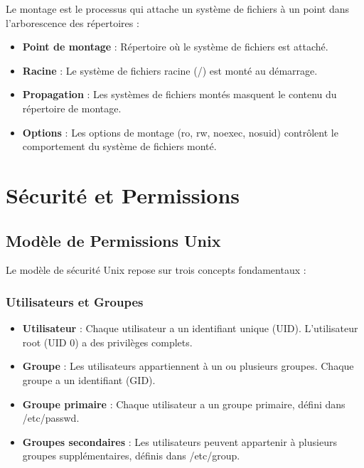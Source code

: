 \documentclass[12pt,a4paper]{article}
\begin{document}
Le montage est le processus qui attache un système de fichiers à un point dans l'arborescence des répertoires :

\begin{itemize}
    \item \textbf{Point de montage} : Répertoire où le système de fichiers est attaché.
    \item \textbf{Racine} : Le système de fichiers racine (/) est monté au démarrage.
    \item \textbf{Propagation} : Les systèmes de fichiers montés masquent le contenu du répertoire de montage.
    \item \textbf{Options} : Les options de montage (ro, rw, noexec, nosuid) contrôlent le comportement du système de fichiers monté.
\end{itemize}


\section{Sécurité et Permissions}

\subsection{Modèle de Permissions Unix}

Le modèle de sécurité Unix repose sur trois concepts fondamentaux :

\subsubsection{Utilisateurs et Groupes}

\begin{itemize}
    \item \textbf{Utilisateur} : Chaque utilisateur a un identifiant unique (UID). L'utilisateur root (UID 0) a des privilèges complets.
    
    \item \textbf{Groupe} : Les utilisateurs appartiennent à un ou plusieurs groupes. Chaque groupe a un identifiant (GID).
    
    \item \textbf{Groupe primaire} : Chaque utilisateur a un groupe primaire, défini dans /etc/passwd.
    
    \item \textbf{Groupes secondaires} : Les utilisateurs peuvent appartenir à plusieurs groupes supplémentaires, définis dans /etc/group.
\end{itemize}
\end{document}
